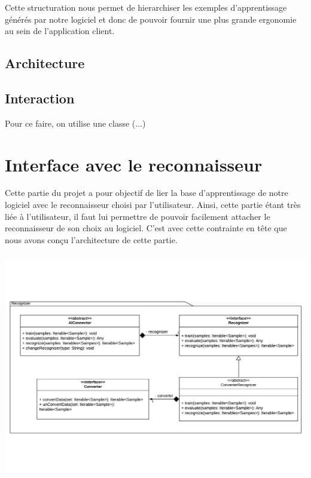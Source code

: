 Cette structuration nous permet de hierarchiser les exemples d'apprentissage générés par notre logiciel et donc de pouvoir fournir une plus grande ergonomie au sein de l'application client. 

\subsection{Architecture}

\subsection{Interaction}

Pour ce faire, on utilise une classe (...)

\section{Interface avec le reconnaisseur}

Cette partie du projet a pour objectif de lier la base d'apprentissage de notre logiciel avec le reconnaisseur choisi par l'utilisateur. Ainsi, cette partie étant très liée à l'utilisateur, il faut lui permettre de pouvoir facilement attacher le reconnaisseur de son choix au logiciel. C'est avec cette contrainte en tête que nous avons conçu l'architecture de cette partie.

\begin{mdframed}[frametitle={Architecture de l'interface avec le reconnaisseur}, innerbottommargin=10]
\begin{center}
\includegraphics[trim={0, 2cm, 0 , 7cm}, scale=0.55, height=100mm]{assets/UML_Recognizer.pdf}
\end{center}
\end{mdframed}

